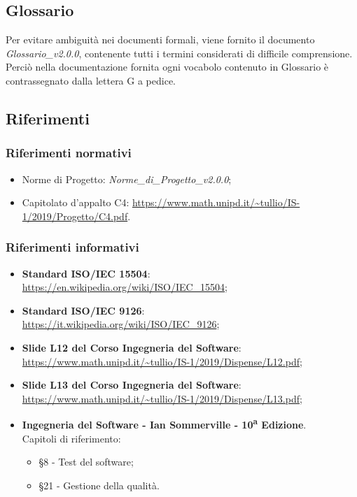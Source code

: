 \subsection{Glossario}
Per evitare ambiguità nei documenti formali, viene fornito il documento \textit{Glossario\_v2.0.0},
contenente tutti i termini considerati di difficile comprensione. Perciò nella documentazione fornita ogni vocabolo contenuto in Glossario è contrassegnato dalla lettera G a pedice.

\subsection{Riferimenti}
\subsubsection{Riferimenti normativi}
\begin{itemize}
	\item Norme di Progetto: \textit{Norme\_di\_Progetto\_v2.0.0};
	\item Capitolato d'appalto C4: \url{https://www.math.unipd.it/~tullio/IS-1/2019/Progetto/C4.pdf}.
\end{itemize}
\subsubsection{Riferimenti informativi}
\begin{itemize}
	\begin{comment}
	Spostato le norme a riferimento normativo
	\end{comment}
	\item \textbf{Standard ISO/IEC 15504}: \\
	\url{https://en.wikipedia.org/wiki/ISO/IEC_15504};
	\item \textbf{Standard ISO/IEC 9126}: \\
	\url{https://it.wikipedia.org/wiki/ISO/IEC_9126};
	\item \textbf{Slide L12 del Corso Ingegneria del Software}:\\
	\url{https://www.math.unipd.it/~tullio/IS-1/2019/Dispense/L12.pdf};
	\item \textbf{Slide L13 del Corso Ingegneria del Software}:\\
	\url{https://www.math.unipd.it/~tullio/IS-1/2019/Dispense/L13.pdf};
	\item \textbf{Ingegneria del Software - Ian Sommerville - 10\textsuperscript{a}  Edizione}.\\ Capitoli di riferimento: \begin{itemize}
	\item \S 8 - Test del software;
	\item \S 21 - Gestione della qualità.
	\end{itemize}
\end{itemize}